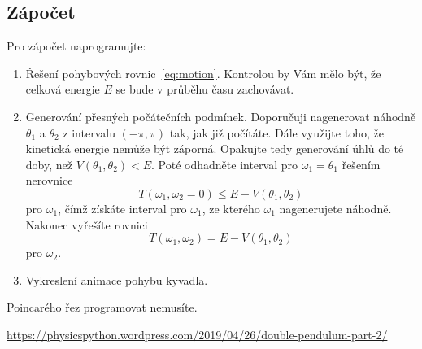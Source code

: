 \documentclass{article}
\begin{document}
    \subsection{Zápočet}
    Pro zápočet naprogramujte:
    \begin{enumerate}
        \item Řešení pohybových rovnic~\eqref{eq:motion}.
            Kontrolou by Vám mělo být, že celková energie $E$ se bude v průběhu času zachovávat.

        \item Generování přesných počátečních podmínek.
            Doporučuji nagenerovat ná\-hod\-ně $\theta_1$ a $\theta_2$ z intervalu $(-\pi,\pi)$ tak, jak již počítáte.
            Dále využijte toho, že kinetická energie nemůže být záporná.
            Opakujte tedy generování úhlů do té doby, než $V(\theta_{1},\theta_{2})<E$.
            Poté odhadněte interval pro $\omega_{1}=\theta_{1}$ řešením nerovnice 
            \begin{equation}
                T(\omega_{1},\omega_{2}=0)\leq E-V(\theta_{1},\theta_{2})
            \end{equation}
            pro $\omega_{1}$, čímž získáte interval pro $\omega_{1}$, ze kterého $\omega_{1}$ nagenerujete náhodně.
            Nakonec vyřešíte rovnici 
            \begin{equation}
                T(\omega_{1},\omega_{2})=E-V(\theta_{1},\theta_{2})
            \end{equation}
            pro $\omega_{2}$.

        \item Vykreslení animace pohybu kyvadla.
    \end{enumerate}
    Poincarého řez programovat nemusíte.

    \begin{thebibliography}{9}
         \url{https://physicspython.wordpress.com/2019/04/26/double-pendulum-part-2/}
    \end{thebibliography}
\end{document}
